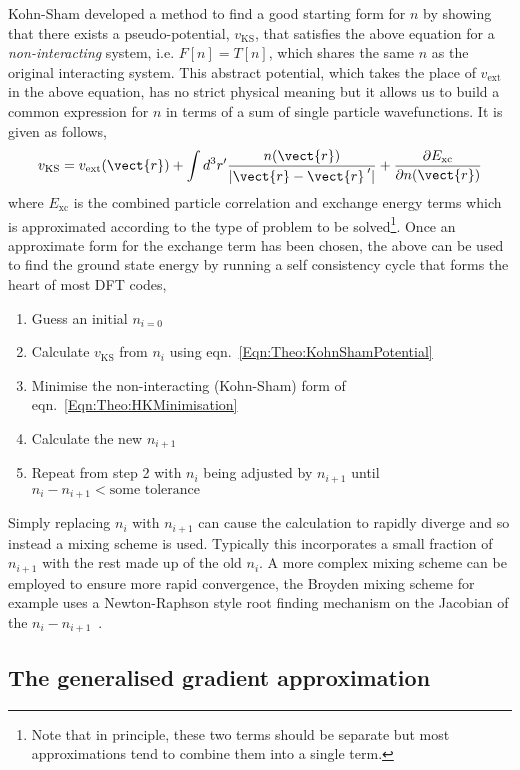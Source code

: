 Kohn-Sham developed a method to find a good starting form for $n$ by showing that there exists a pseudo-potential, $v_{\textrm{KS}}$, that satisfies the above equation for a \emph{non-interacting} system, i.e. $F[n] = T[n]$, which shares the same $n$ as the original interacting system. This abstract potential, which takes the place of $v_{\textrm{ext}}$ in the above equation, has no strict physical meaning but it allows us to build a common expression for $n$ in terms of a sum of single particle wavefunctions. It is given as follows,
\begin{equation}
\label{Eqn:Theo:KohnShamPotential}
v_{\textrm{KS}} = v_{\textrm{ext}}(\vect{r}) + \int d^3r^\prime\frac{n(\vect{r})}{|\vect{r}-\vect{r}^{\hspace{2px}\prime}|} + \frac{\partial E_{\textrm{xc}}}{\partial n(\vect{r})}
\end{equation}
where $E_{\textrm{xc}}$ is the combined particle correlation and exchange energy terms which is approximated according to the type of problem to be solved\footnote{Note that in principle, these two terms should be separate but most approximations tend to combine them into a single term.}.  Once an approximate form for the exchange term has been chosen, the above can be used to find the ground state energy by running a self consistency cycle that forms the heart of most \ac{DFT} codes,
\begin{enumerate}
    \item Guess an initial $n_{i=0}$
    \item Calculate $v_{\textrm{KS}}$ from $n_{i}$ using eqn.~\ref{Eqn:Theo:KohnShamPotential}
    \item Minimise the non-interacting (Kohn-Sham) form of eqn.~\ref{Eqn:Theo:HKMinimisation}
    \item Calculate the new $n_{i+1}$
    \item Repeat from step 2 with $n_i$ being adjusted by $n_{i+1}$ until $n_{i} - n_{i+1} < \textrm{some tolerance}$
\end{enumerate}
Simply replacing $n_{i}$ with $n_{i+1}$ can cause the calculation to rapidly diverge and so instead a mixing scheme is used. Typically this incorporates a small fraction of $n_{i+1}$ with the rest made up of the old $n_{i}$. A more complex mixing scheme can be employed to ensure more rapid convergence, the Broyden mixing scheme for example uses a Newton-Raphson style root finding mechanism on the Jacobian of the $n_{i} - n_{i+1}$~\cite{Broyden1965}.


\subsection{The generalised gradient approximation}

